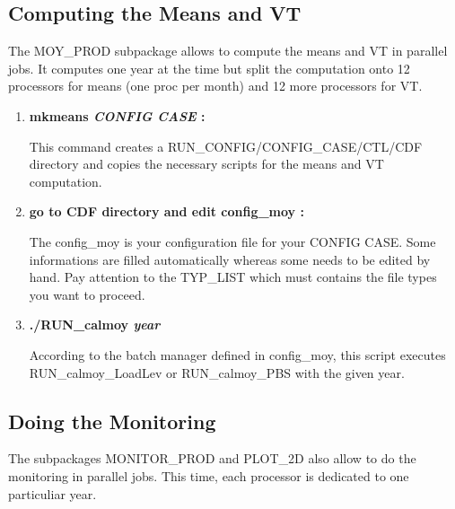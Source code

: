 \documentclass[a4paper,11pt]{article}
\begin{document}
\subsection{Computing the Means and VT}

The MOY\_PROD subpackage allows to compute the means and VT in parallel jobs. It computes one year
at the time but split the computation onto 12 processors for means (one proc per month) and 12 more
processors for VT.
\\[0.2cm]
\par


\begin{enumerate}
\item  \textbf{mkmeans \textit{CONFIG CASE} :}

This command creates a RUN\_CONFIG/CONFIG\_CASE/CTL/CDF directory and copies the necessary
scripts for the means and VT computation.

\item \textbf{go to CDF directory and edit config\_moy :}

The config\_moy is your configuration file for your CONFIG CASE. Some informations are
filled automatically whereas some needs to be edited by hand. Pay attention to the
TYP\_LIST which must contains the file types you want to proceed.

\item \textbf{./RUN\_calmoy \textit{year}}

According to the batch manager defined in config\_moy, this script executes
RUN\_calmoy\_LoadLev or RUN\_calmoy\_PBS with the given year.

\end{enumerate}

\subsection{Doing the Monitoring}

The subpackages MONITOR\_PROD and PLOT\_2D also allow to do the monitoring in parallel jobs.
This time, each processor is dedicated to one particuliar year.
\\[0.2cm]
\par
\end{document}
